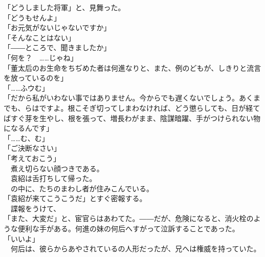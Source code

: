 \documentclass[
  paper=a5,
  fontsize=10pt,
  jafontsize=9.5pt,
  tate,                  %
  open_bracket_pos=nibu, %
]{jlreq}
\begin{document}
「どうしました将軍」と、見舞った。\\


「どうもせんよ」\\


「お元気がないじゃないですか」\\


「そんなことはない」\\


「――ところで、聞きましたか」\\


「何を？　……じゃね」\\


「董太后のお生命をちぢめた者は何進なりと、また、例のどもが、しきりと流言を放っているのを」\\


「……ふウむ」\\


「だから私がいわない事ではありません。今からでも遅くないでしょう。あくまでも、らはですよ。根こそぎ切ってしまわなければ、どう懲らしても、日が経てばすぐ芽を生やし、根を張って、増長わがまま、陰謀暗躍、手がつけられない物になるんです」\\


「……む、む」\\


「ご決断なさい」\\


「考えておこう」\\


　煮え切らない顔つきである。\\


　袁紹は舌打ちして帰った。\\


　の中に、たちのまわし者が住みこんでいる。\\


「袁紹が来てこうこうだ」とすぐ密報する。\\


　諜報をうけて、\\


「また、大変だ」と、宦官らはあわてた。――だが、危険になると、消火栓のような便利な手がある。何進の妹の何后へすがって泣訴することであった。\\


「いいよ」\\


　何后は、彼らからあやされているの人形だったが、兄へは権威を持っていた。\\
\end{document}
